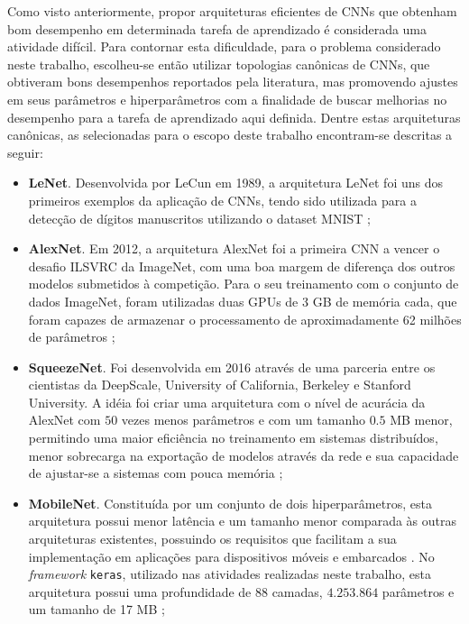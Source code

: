 
Como visto anteriormente, propor arquiteturas eficientes de CNNs que obtenham bom desempenho em determinada tarefa de aprendizado é considerada uma atividade difícil. Para contornar esta dificuldade, para o problema considerado neste trabalho, escolheu-se então utilizar topologias canônicas de CNNs, que obtiveram bons desempenhos reportados pela literatura, mas promovendo ajustes em seus parâmetros e hiperparâmetros com a finalidade de buscar melhorias  no desempenho para a tarefa de aprendizado aqui definida. Dentre estas arquiteturas canônicas, as selecionadas para o escopo deste trabalho encontram-se descritas a seguir:

\begin{itemize}
	\item \textbf{LeNet}. Desenvolvida por LeCun em 1989, a arquitetura LeNet foi uns dos primeiros exemplos da aplicação de CNNs, tendo sido utilizada para a detecção de dígitos manuscritos utilizando o dataset MNIST \cite{lecun};
	\item \textbf{AlexNet}. Em 2012, a arquitetura AlexNet foi a primeira CNN a vencer o desafio ILSVRC da ImageNet, com uma boa margem de diferença dos outros modelos submetidos à competição. Para o seu treinamento com o conjunto de dados ImageNet, foram utilizadas duas GPUs de 3 GB de memória cada, que foram capazes de armazenar o processamento de aproximadamente 62 milhões de parâmetros \cite{alexnet,khan};
	\item \textbf{SqueezeNet}. Foi desenvolvida em 2016 através de uma parceria entre os cientistas da DeepScale, University of California, Berkeley e Stanford University. A idéia foi criar uma arquitetura com o nível de acurácia da AlexNet com $50$ vezes menos parâmetros e com um tamanho $0.5$ MB menor, permitindo uma maior eficiência no treinamento em sistemas distribuídos, menor sobrecarga na exportação de modelos através da rede e sua capacidade de ajustar-se a sistemas com pouca memória \cite{squeezenet};
	\item \textbf{MobileNet}. Constituída por um conjunto de dois hiperparâmetros, esta arquitetura possui menor latência e um tamanho menor comparada às outras arquiteturas existentes, possuindo os requisitos que facilitam a sua implementação em aplicações para dispositivos móveis e embarcados \cite{mobilenet}. No \emph{framework} \texttt{keras}, utilizado nas atividades realizadas neste trabalho, esta arquitetura possui uma profundidade de $88$ camadas, $4.253.864$ parâmetros e um tamanho de 17 MB \cite{keras};

\end{itemize}
